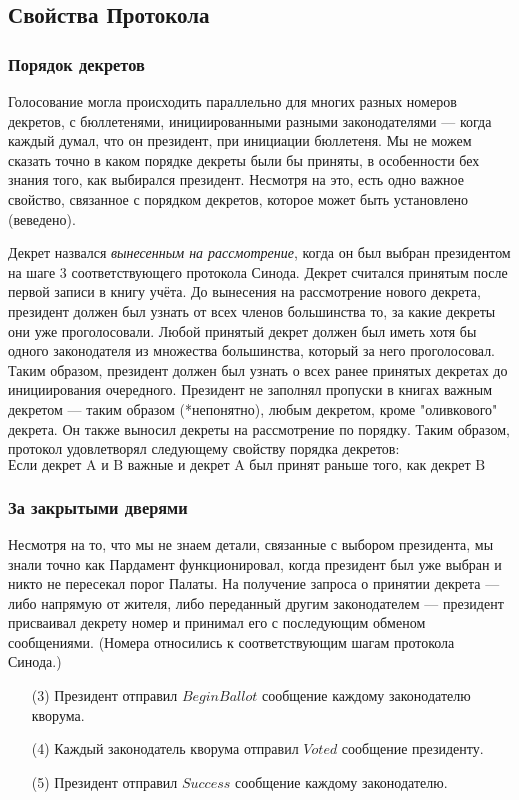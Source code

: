 \documentclass[12pt, a4paper]{article} %
\begin{document}
\subsection{Свойства Протокола}
\subsubsection{Порядок декретов}

Голосование могла происходить параллельно для многих разных номеров декретов, с бюллетенями, инициированными разными законодателями --- когда каждый думал, что он президент, при инициации бюллетеня. Мы не можем сказать точно в каком порядке декреты были бы приняты, в особенности бех знания того, как выбирался президент. Несмотря на это, есть одно важное свойство, связанное с порядком декретов, которое может быть установлено (веведено).

Декрет назвался \textit{вынесенным на рассмотрение}, когда он был выбран президентом на шаге 3 соответствующего протокола Синода. Декрет считался принятым после первой записи в книгу учёта.  До вынесения на рассмотрение нового декрета, президент должен был узнать от всех членов большинства то, за какие декреты они уже проголосовали. Любой принятый декрет должен был иметь хотя бы одного законодателя из множества большинства, который за него проголосовал. Таким образом, президент должен был узнать о всех ранее принятых декретах до инициирования очередного. Президент не заполнял пропуски в книгах важным декретом --- таким образом (*непонятно), любым декретом, кроме "оливкового" декрета. Он также выносил декреты на рассмотрение по порядку. Таким образом, протокол удовлетворял следующему свойству порядка декретов:
\[
    \mbox{Если декрет A и B важные и декрет A был принят раньше того, как декрет B был вынесен на рассмотрение, тогда A имеет меньший номер, чем B.}
\]

\subsubsection{За закрытыми дверями}

Несмотря на то, что мы не знаем детали, связанные с выбором президента, мы знали точно как Пардамент функционировал, когда президент был уже выбран и никто не пересекал порог Палаты. На получение запроса о принятии декрета --- либо напрямую от жителя, либо переданный другим законодателем --- президент присваивал декрету номер и принимал его с последующим обменом сообщениями. (Номера относились к соответствующим шагам протокола Синода.) 
\begin{itemize}
    \item[(3)] Президент отправил $BeginBallot$ сообщение каждому законодателю кворума.
    \item[(4)] Каждый законодатель кворума отправил $Voted$ сообщение президенту.
    \item[(5)] Президент отправил $Success$ сообщение каждому законодателю.
\end{itemize}
\end{document}
